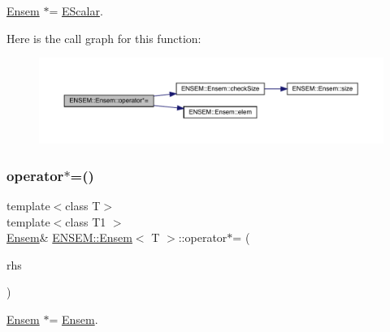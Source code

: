 \mbox{\hyperlink{classENSEM_1_1Ensem}{Ensem}} $\ast$= \mbox{\hyperlink{classENSEM_1_1EScalar}{E\+Scalar}}. 

Here is the call graph for this function\+:
\nopagebreak
\begin{figure}[H]
\begin{center}
\leavevmode
\includegraphics[width=350pt]{d7/d3e/classENSEM_1_1Ensem_abacb93dfca393ddb29f317d35e2fff7f_cgraph}
\end{center}
\end{figure}
\mbox{\label{classENSEM_1_1Ensem_ae6590e101b18547ec3d2682ecbea0371}} 
\subsubsection{\texorpdfstring{operator$\ast$=()}{operator*=()}\hspace{0.1cm}{\footnotesize\ttfamily [3/4]}}
{\footnotesize\ttfamily template$<$class T$>$ \\
template$<$class T1 $>$ \\
\mbox{\hyperlink{classENSEM_1_1Ensem}{Ensem}}\& \mbox{\hyperlink{classENSEM_1_1Ensem}{E\+N\+S\+E\+M\+::\+Ensem}}$<$ T $>$\+::operator$\ast$= (\begin{DoxyParamCaption}\item[{const \mbox{\hyperlink{classENSEM_1_1Ensem}{Ensem}}$<$ T1 $>$ \&}]{rhs }\end{DoxyParamCaption})\hspace{0.3cm}{\ttfamily [inline]}}



\mbox{\hyperlink{classENSEM_1_1Ensem}{Ensem}} $\ast$= \mbox{\hyperlink{classENSEM_1_1Ensem}{Ensem}}. 

